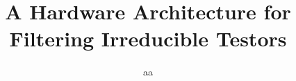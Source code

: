 \documentclass[conference]{IEEEtran}
\begin{document}
%
\title{A Hardware Architecture for Filtering Irreducible Testors}




% 
\author{aa}








\maketitle
\end{document}
